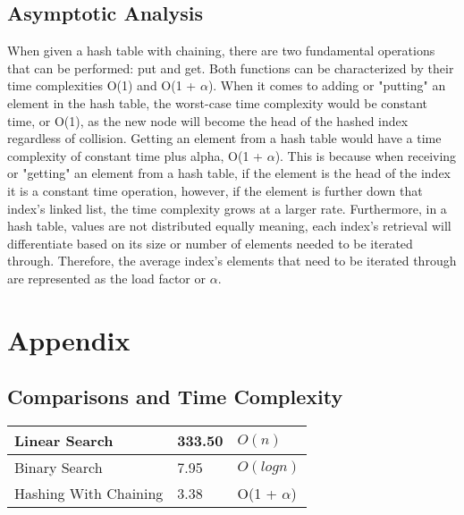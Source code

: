 \documentclass[letterpaper, 10pt,DIV=13]{scrartcl}
\numberwithin{equation}{section} %
\numberwithin{figure}{section} %
\numberwithin{table}{section} %
\begin{document}
\subsection{Asymptotic Analysis}
When given a hash table with chaining, there are two fundamental operations that can be performed: put and get. Both functions can be characterized by their time complexities O(1) and O(1 + $\alpha$). When it comes to adding or "putting" an element in the hash table, the worst-case time complexity would be constant time, or O(1), as the new node will become the head of the hashed index regardless of collision. Getting an element from a hash table would have a time complexity of constant time plus alpha, O(1 + $\alpha$). This is because when receiving or "getting" an element from a hash table, if the element is the head of the index it is a constant time operation, however, if the element is further down that index's linked list, the time complexity grows at a larger rate. Furthermore, in a hash table, values are not distributed equally meaning, each index's retrieval will differentiate based on its size or number of elements needed to be iterated through. Therefore, the average index's elements that need to be iterated through are represented as the load factor or $\alpha$.

\pagebreak


\section{Appendix}

\subsection{Comparisons and Time Complexity}
    \begin{center}
        \begin{tabular}{|l|l|l|}
            \hline
            Linear Search & 333.50 & $O(n)$  \\ \hline
            Binary Search & 7.95 & $O(logn)$ \\ \hline
            Hashing With Chaining     & 3.38 & O(1 + $\alpha$) \\ \hline
        \end{tabular}
    \end{center}
\end{document}
